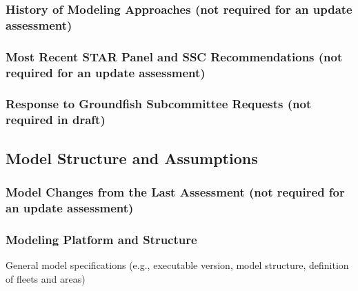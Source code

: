 \documentclass[11pt,
  english,
  letterpaper,
]{article}
\begin{document}
\hypertarget{history-of-modeling-approaches-not-required-for-an-update-assessment}{%
\subsubsection{History of Modeling Approaches (not required for an update assessment)}\label{history-of-modeling-approaches-not-required-for-an-update-assessment}}

\hypertarget{most-recent-star-panel-and-ssc-recommendations-not-required-for-an-update-assessment}{%
\subsubsection{Most Recent STAR Panel and SSC Recommendations (not required for an update assessment)}\label{most-recent-star-panel-and-ssc-recommendations-not-required-for-an-update-assessment}}

\hypertarget{response-to-groundfish-subcommittee-requests-not-required-in-draft}{%
\subsubsection{Response to Groundfish Subcommittee Requests (not required in draft)}\label{response-to-groundfish-subcommittee-requests-not-required-in-draft}}

\hypertarget{model-structure-and-assumptions}{%
\subsection{Model Structure and Assumptions}\label{model-structure-and-assumptions}}

\hypertarget{model-changes-from-the-last-assessment-not-required-for-an-update-assessment}{%
\subsubsection{Model Changes from the Last Assessment (not required for an update assessment)}\label{model-changes-from-the-last-assessment-not-required-for-an-update-assessment}}

\hypertarget{modeling-platform-and-structure}{%
\subsubsection{Modeling Platform and Structure}\label{modeling-platform-and-structure}}

General model specifications (e.g., executable version, model structure, definition of fleets and areas)
\end{document}
